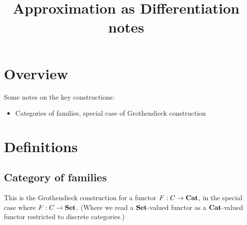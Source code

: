 \documentclass{acmart}
\begin{document}
\title{Approximation as Differentiation notes}
\maketitle

\section{Overview}

Some notes on the key constructions:
\begin{itemize}
\item Categories of families, special case of Grothendieck construction
\end{itemize}

\section{Definitions}

\subsection{Category of families}

This is the Grothendieck construction for a functor $F: C \to \mathbf{Cat}$, in the special case where $F: C \to
\mathbf{Set}$. (Where we read a $\mathbf{Set}$-valued functor as a $\mathbf{Cat}$-valued functor restricted to discrete categories.)
\end{document}
